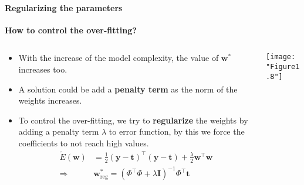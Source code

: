 \begin{frame}{\insertsubsection}
\begin{columns}
\begin{column}{0.475\textwidth}
\begin{animateinline}{5}
			 \end{animateinline}
		\end{column}
	\end{columns}
\end{frame}

\begin{frame}{\insertsubsection}
	\framesubtitle{Regularizing the parameters}
	\textcolor{UniGold}{\textbf{How to control the over-fitting?}}
	\begin{columns}
		\begin{column}{0.475\textwidth}
			\begin{itemize}	
			\item With the increase of the model complexity, the value of $\mathbf{w}^*$ increases too.
			\item A solution could be add a \textcolor{UniOrange}{\textbf{penalty term}} as the norm of the weights increases.
			\item To control the over-fitting, we try to \textcolor{UniOrange}{\textbf{regularize}} the weights by adding a penalty term $\lambda$ to error function, by this we force the coefficients to not reach high values.
			\begin{align*}
				\tilde{E}(\mathbf{w}) &=\frac{1}{2} (\mathbf{y}-\mathbf{t})^{\top}(\mathbf{y}-\mathbf{t}) +\frac{\lambda}{2} \mathbf{w}^{\top}\mathbf{w} \\
		\Rightarrow & \mathbf{w}^*_\text{reg} = \left( \Phi^{\top} \Phi + \lambda \mathbf{I} \right)^{-1} \Phi^{\top} \mathbf{t}
	\end{align*}			
			\end{itemize}
		\end{column}
		\begin{column}{0.475\textwidth}  %
			\centering
			\texttt{[image: "Figure1.8"]}
		\end{column}
	\end{columns}
\end{frame}


